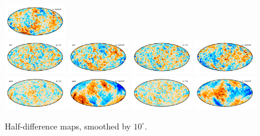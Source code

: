 \documentclass[twocolumn]{../../common/aa}
\begin{document}
\begin{figure}
	\includegraphics[width=0.24\textwidth]{figures/Q_W_deltaU.pdf}\\
	\includegraphics[width=0.24\textwidth]{figures/V_deltaQ.pdf}
	\includegraphics[width=0.24\textwidth]{figures/V_W_deltaQ.pdf}
	\includegraphics[width=0.24\textwidth]{figures/V_deltaU.pdf}
	\includegraphics[width=0.24\textwidth]{figures/V_W_deltaU.pdf}\\
	\includegraphics[width=0.24\textwidth]{figures/W_deltaQ.pdf}
	\includegraphics[width=0.24\textwidth]{figures/W_W_deltaQ.pdf}
	\includegraphics[width=0.24\textwidth]{figures/W_deltaU.pdf}
	\includegraphics[width=0.24\textwidth]{figures/W_W_deltaU.pdf}
	\caption{Half-difference maps, smoothed by $10^\circ$.}
\end{figure}
\end{document}
